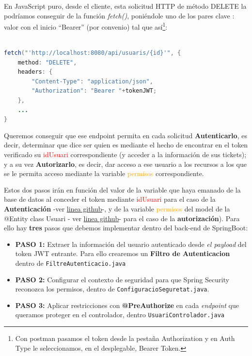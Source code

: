 \documentclass[a4paper,12pt]{report}
\begin{document}
		
		En JavaScript puro, desde el cliente, esta solicitud HTTP de método DELETE la podríamos conseguir de la función \textit{fetch()}, poniéndole uno de los pares clave : valor con el inicio ``Bearer'' (por convenio) tal que así\footnote{Con postman pasamos el token desde la pestaña Authorization y en Auth Type le seleccionamos, en el desplegable, Bearer Token.}:
		
				
\begin{lstlisting}[language=Java, basicstyle=\ttfamily\footnotesize, keywordstyle=\color{magenta}]

fetch("'http://localhost:8080/api/usuaris/{id}'", {
	method: "DELETE",
	headers: {
		"Content-Type": "application/json",
		"Authorization": "Bearer "+tokenJWT;
	},
	...
}
\end{lstlisting}
		
		 Queremos conseguir que ese endpoint permita en cada solicitud \textbf{Autenticarlo}, es decir, determinar que dice ser quien es mediante el hecho de encontrar en el token verificado su \textcolor{red}{idUsuari} correspondiente (y acceder a la información de sus tickets); y a su vez \textbf{Autorizarlo}, es decir, dar acceso a ese usuario a los recursos a los que se le permita acceso mediante la variable \textcolor{orange}{permisos} correspondiente.
		
		 Estos dos pasos irán en función del valor de la variable que haya emanado de la base de datos al conceder el token mediante \textcolor{red}{idUsuari} para el caso de la \textbf{Autenticación} -ver \href{https://github.com/blackcub3s/mercApp/blob/b01cec515bb9af27a1faa24258abb4313ef275cd/APP%20WEB/__springboot__produccio__/app/src/main/java/miApp/app/Usuaris/model/Usuari.java#L30}{linea github}-, y de la variable \textcolor{orange}{permisos} del model de la @Entity class Usuari - ver \href{https://github.com/blackcub3s/mercApp/blob/b01cec515bb9af27a1faa24258abb4313ef275cd/APP%20WEB/__springboot__produccio__/app/src/main/java/miApp/app/Usuaris/model/Usuari.java#L42}{linea github}- para el caso de la \textbf{autorización}). Para ello hay \textbf{tres} pasos que debemos implementar dentro del back-end de SpringBoot:
		
		
		
		
		\begin{itemize} 
			\setlength{\itemsep}{-1.5em}
			\item \textbf{PASO 1:} Extraer la información del usuario autenticado desde \textit{el payload} del token JWT entrante. Para ello crearemos un \textbf{Filtro de Autenticacion} dentro de \texttt{FiltreAutenticacio.java}\\
			\item \textbf{PASO 2:} Configurar el contexto de seguridad para que Spring Security reconozca los permisos, dentro de  \texttt{ConfiguracioSeguretat.java}. \\ 	
			\item \textbf{PASO 3:} Aplicar restricciones con \textbf{@PreAuthorize} en cada \textit{endpoint} que queramos proteger en el controlador, dentro \texttt{UsuariControlador.java}
		\end{itemize}
		
\end{document}
